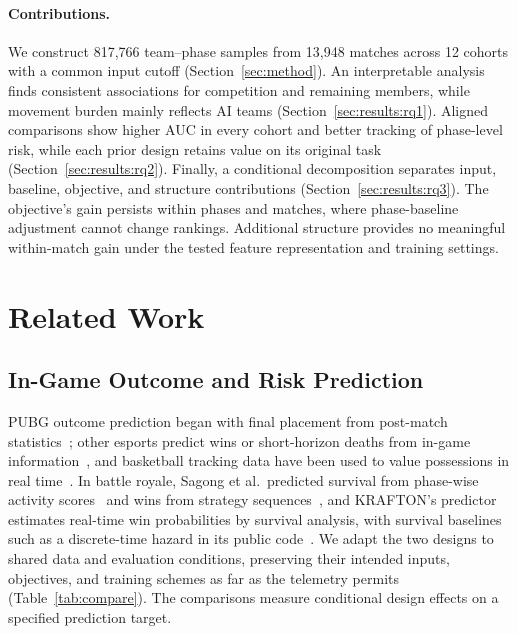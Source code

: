 \documentclass[sigconf,anonymous,nonacm]{acmart}
\begin{document}
\paragraph{Contributions.}
We construct 817,766 team--phase samples from 13,948 matches across 12 cohorts with a common input cutoff (Section~\ref{sec:method}). An interpretable analysis finds consistent associations for competition and remaining members, while movement burden mainly reflects AI teams (Section~\ref{sec:results:rq1}). Aligned comparisons show higher AUC in every cohort and better tracking of phase-level risk, while each prior design retains value on its original task (Section~\ref{sec:results:rq2}). Finally, a conditional decomposition separates input, baseline, objective, and structure contributions (Section~\ref{sec:results:rq3}). The objective's gain persists within phases and matches, where phase-baseline adjustment cannot change rankings. Additional structure provides no meaningful within-match gain under the tested feature representation and training settings.

\section{Related Work}
\label{sec:related}

\subsection{In-Game Outcome and Risk Prediction}
\label{sec:related:esports}
PUBG outcome prediction began with final placement from post-match statistics~\cite{KagglePUBG,LeeLee25}; other esports predict wins or short-horizon deaths from in-game information~\cite{Hodge21,Katona19,Marshall22}, and basketball tracking data have been used to value possessions in real time~\cite{Cervone16}.
In battle royale, Sagong et al.\ predicted survival from phase-wise activity scores~\cite{Sagong25a} and wins from strategy sequences~\cite{Sagong25b}, and KRAFTON's predictor estimates real-time win probabilities by survival analysis, with survival baselines such as a discrete-time hazard in its public code~\cite{KRAFTON}.
We adapt the two designs to shared data and evaluation conditions, preserving their intended inputs, objectives, and training schemes as far as the telemetry permits (Table~\ref{tab:compare}). The comparisons measure conditional design effects on a specified prediction target.
\end{document}
